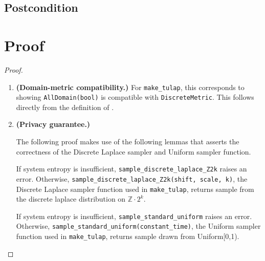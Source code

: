 \documentclass{article}
\begin{document}


\subsection*{Postcondition}


\section{Proof}

\begin{proof} 
\hfill
\begin{enumerate}
    \item \textbf{(Domain-metric compatibility.)} For \texttt{make\_tulap}, this corresponds to showing \texttt{AllDomain(bool)} is compatible with \texttt{DiscreteMetric}. 
    This follows directly from the definition of .

    \item \textbf{(Privacy guarantee.)} 

    \begin{tcolorbox}
\begin{note}
The following proof makes use of the following lemmas that asserts the correctness of the Discrete Laplace sampler and Uniform sampler function.
    \begin{lemma}
    If system entropy is insufficient, \texttt{sample\_discrete\_laplace\_Z2k} raises an error. 
    Otherwise, \texttt{sample\_discrete\_laplace\_Z2k(shift, scale, k)}, the Discrete Laplace sampler function used in \texttt{make\_tulap}, 
    returns sample from the discrete laplace distribution on $\mathbb{Z} \cdot 2^k$.
    \end{lemma}
    \begin{lemma}
    If system entropy is insufficient, \texttt{sample\_standard\_uniform} raises an error. 
    Otherwise, \texttt{sample\_standard\_uniform(constant\_time)}, the Uniform sampler function used in \texttt{make\_tulap}, 
    returns sample drawn from Uniform[0,1).
    \end{lemma}
\end{note}
\end{tcolorbox}


\end{enumerate}
\end{proof}
\end{document}
